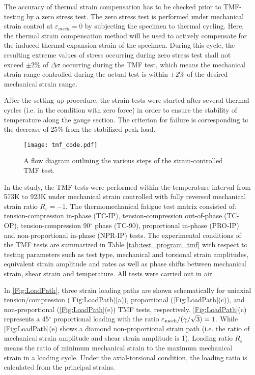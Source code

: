 The accuracy of thermal strain compensation has to be checked prior to TMF-testing by a zero stress test. The zero stress test is performed under mechanical strain control at $\varepsilon_{mech}=0$ by subjecting the specimen to thermal cycling. Here, the thermal strain compensation method will be used to actively compensate for the induced thermal expansion strain of the specimen. During this cycle, the resulting extreme values of stress occurring during zero stress test shall not exceed $\pm$2\% of $\Delta \sigma$ occurring during the TMF test, which means the mechanical strain range controlled during the actual test is within $\pm$2\% of the desired mechanical strain range.

After the setting up procedure, the strain tests were started after several thermal cycles (i.e. in the condition with zero force) in order to ensure the stability of temperature along the gauge section. The criterion for failure is corresponding to the decrease of 25\% from the stabilized peak load.

\begin{figure}[!htp]
\centering
\texttt{[image: tmf\_code.pdf]}
\caption{A flow diagram outlining the various steps of the strain-controlled TMF test.}
\label{Fig:tmf_code}
\end{figure}

In the study, the TMF tests were performed within the temperature interval from 573K to 923K under mechanical strain controlled with fully reversed mechanical strain ratio $R_{\varepsilon}=-1$. The thermomechanical fatigue test matrix consisted of: tension-compression in-phase (TC-IP), tension-compression out-of-phase (TC-OP), tension-compression 90$^\circ$ phase (TC-90), proportional in-phase (PRO-IP) and non-proportional in-phase (NPR-IP) tests. The experimental conditions of the TMF tests are summarized in Table \ref{tab:test_program_tmf} with respect to testing parameters such as test type, mechanical and torsional strain amplitudes, equivalent strain amplitude and rates as well as phase shifts between mechanical strain, shear strain and temperature. All tests were carried out in air.

In \ref{Fig:LoadPath}, three strain loading paths are shown schematically for uniaxial tension/compression (\ref{Fig:LoadPath}(a)), proportional (\ref{Fig:LoadPath}(c)), and non-proportional (\ref{Fig:LoadPath}(e)) TMF tests, respectively. \ref{Fig:LoadPath}(c) represents a 45$^\circ$ proportional loading with the ratio $\varepsilon_{\rm mech}/(\gamma/\sqrt{3})=1$. While \ref{Fig:LoadPath}(e) shows a diamond non-proportional strain path (i.e. the ratio of mechanical strain amplitude and shear strain amplitude is 1). Loading ratio $R_\varepsilon$ means the ratio of minimum mechanical strain to the maximum mechanical strain in a loading cycle. Under the axial-torsional condition, the loading ratio is calculated from the principal strains.

